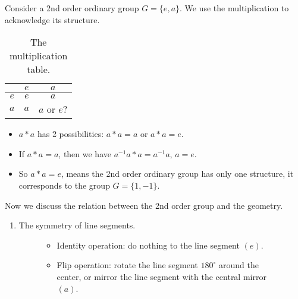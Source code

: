 \begin{example}
    Consider a 2nd order ordinary group $G=\{e,a\}$. We use the multiplication  to acknowledge its structure.
    \begin{table}[!ht]
        \begin{minipage}{.32\linewidth}
            \centering
            \caption{The multiplication table.}
            \begin{tabular}{ c | c c }
                \toprule
                    & $e$ & $a$\\
                \midrule
                $e$ & $e$ & $a$\\
                $a$ & $a$ & $a$ or $e$?\\
                \bottomrule
            \end{tabular}
            \label{1.1}
        \end{minipage}
        \hfill
        \begin{minipage}{.64\linewidth}
            \begin{itemize}
                \item $a*a$ has 2 possibilities: $a*a=a$ or $a*a=e$.
                \item If $a*a=a$, then we have $a^{-1}a*a=a^{-1}a$, $a=e$.
                \item So $a*a=e$, means the 2nd order ordinary group has only one structure, it corresponds to the group $G=\{1,-1\}$.
            \end{itemize}
        \end{minipage}
    \end{table}

    Now we discuss the relation between the 2nd order group and the geometry.
    \begin{enumerate}
        \item The symmetry of line segments.
        \begin{figure}[!ht]
            \begin{minipage}{.32\linewidth}
                \centering
            \end{minipage}
            \hfill
            \begin{minipage}{.64\linewidth}
                \begin{itemize}
                    \item Identity operation: do nothing to the line segment $(e)$.
                    \item Flip operation: rotate the line segment $180^\circ$ around the center, or mirror the line segment with the central mirror $(a)$.
                \end{itemize}
            \end{minipage}
        \end{figure}
        

\end{enumerate}
\end{example}
